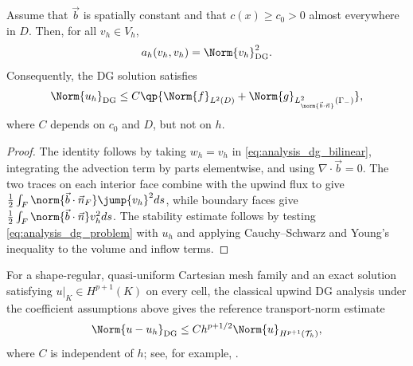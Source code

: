 \documentclass[final]{amsart}
\begin{document}
\begin{proposition}
\label{prop:analysis_discrete_stability}
Assume that $\vec b$ is spatially constant and that $c(x)\geq c_0>0$
almost everywhere in $D$. Then, for all $v_h\in V_h$,
\begin{equation}
  a_h(v_h,v_h)=\Norm{v_h}_{\mathrm{DG}}^2.
\label{eq:analysis_dg_coercivity_identity}
\end{equation}
Consequently, the DG solution satisfies
\begin{equation}
\Norm{u_h}_{\mathrm{DG}}
\leq
C
\qp{
\Norm{f}_{L^2(D)}
+
\Norm{g}_{L^2_{\norm{\vec b\cdot\vec n}}(\Gamma_-)}
},
\label{eq:analysis_dg_stability}
\end{equation}
where $C$ depends on $c_0$ and $D$, but not on $h$.
\end{proposition}

\begin{proof}
The identity follows by taking $w_h=v_h$ in
\eqref{eq:analysis_dg_bilinear}, integrating the advection term by
parts elementwise, and using $\nabla\cdot\vec b=0$. The two traces on
each interior face combine with the upwind flux to give
$\frac{1}{2}\int_F\norm{\vec b\cdot\vec n_F}\jump{v_h}^2ds$, while boundary faces
give $\frac{1}{2}\int_F\norm{\vec b\cdot\vec n}v_h^2ds$. The stability
estimate follows by testing \eqref{eq:analysis_dg_problem} with $u_h$
and applying Cauchy--Schwarz and Young's inequality to the volume and
inflow terms.
\end{proof}

For a shape-regular, quasi-uniform Cartesian mesh family and an exact
solution satisfying
$u|_K\in H^{p+1}(K)$ on every cell, the classical upwind DG analysis
under the coefficient assumptions above gives the reference
transport-norm estimate
\begin{equation}
\Norm{ u-u_h}_{\mathrm{DG}}
\leq
C h^{p+1/2}
\Norm{ u}_{H^{p+1}(\mathcal{T}_h)},
\label{eq:analysis_dg_error}
\end{equation}
where $C$ is independent of $h$; see, for example,
\cite{JohnsonPitkaranta1986,CockburnDongGuzman2008}.
\end{document}
